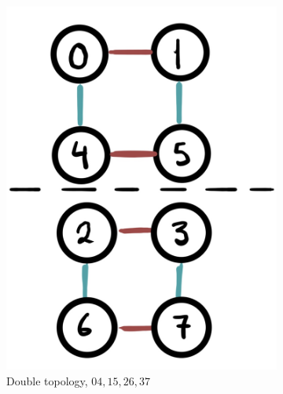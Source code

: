 \documentclass[a4paper,11pt,aps,tightenlines,nofootinbib]{revtex4}
\begin{document}
\begin{figure}[h]
\begin{subfigure}[b]{.3\textwidth}
                \includegraphics[scale=.1]{images/dipole_disjoint.jpg}
                \caption{Double topology, $04,15,26,37$}
                \end{subfigure}
                \begin{subfigure}[b]{.2\textwidth}

\end{subfigure}
\end{figure}
\end{document}
